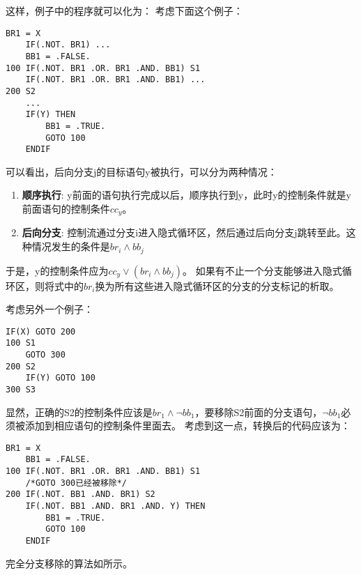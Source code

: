 这样，例子中的程序就可以化为：
考虑下面这个例子：
\begin{lstlisting}[language=FORTRAN]
	BR1 = X
	IF(.NOT. BR1) ...
	BB1 = .FALSE.
100	IF(.NOT. BR1 .OR. BR1 .AND. BB1) S1
	IF(.NOT. BR1 .OR. BR1 .AND. BB1) ...
200	S2
	...
	IF(Y) THEN
		BB1 = .TRUE.
		GOTO 100
	ENDIF
\end{lstlisting}

可以看出，后向分支j的目标语句y被执行，可以分为两种情况：
\begin{enumerate}
\item \textbf{顺序执行}:
y前面的语句执行完成以后，顺序执行到y，此时y的控制条件就是y前面语句的控制条件$cc_y$。
\item \textbf{后向分支}:
控制流通过分支i进入隐式循环区，然后通过后向分支j跳转至此。这种情况发生的条件是$br_i\wedge bb_j$
\end{enumerate}
于是，y的控制条件应为$cc_y\vee\left(br_i\wedge bb_j\right)$。
如果有不止一个分支能够进入隐式循环区，则将式中的$br_i$换为所有这些进入隐式循环区的分支的分支标记的析取。

考虑另外一个例子：
\begin{lstlisting}[language=FORTRAN]
	IF(X) GOTO 200
100	S1
	GOTO 300
200	S2
	IF(Y) GOTO 100
300	S3
\end{lstlisting}
显然，正确的S2的控制条件应该是$br_1\wedge \neg bb_1$，要移除S2前面的分支语句，$\neg bb_1$必须被添加到相应语句的控制条件里面去。
考虑到这一点，转换后的代码应该为：
\begin{lstlisting}[language=FORTRAN]
	BR1 = X
	BB1 = .FALSE.
100	IF(.NOT. BR1 .OR. BR1 .AND. BB1) S1
	/*GOTO 300已经被移除*/
200	IF(.NOT. BB1 .AND. BR1) S2
	IF(.NOT. BB1 .AND. BR1 .AND. Y) THEN
		BB1 = .TRUE.
		GOTO 100
	ENDIF
\end{lstlisting}
完全分支移除的算法如所示。

